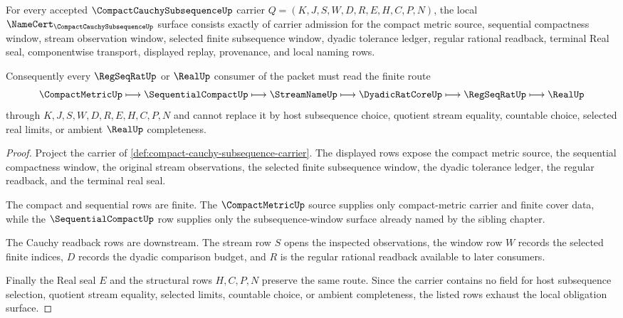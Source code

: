 \begin{theorem}
\label{thm:compact-cauchy-subsequence-obligation-surface}
For every accepted $\CompactCauchySubsequenceUp$ carrier $Q=(K,J,S,W,D,R,E,H,C,P,N)$, the local $\NameCert_{\CompactCauchySubsequenceUp}$ surface consists exactly of carrier admission for the compact metric source, sequential compactness window, stream observation window, selected finite subsequence window, dyadic tolerance ledger, regular rational readback, terminal Real seal, componentwise transport, displayed replay, provenance, and local naming rows.

Consequently every $\RegSeqRatUp$ or $\RealUp$ consumer of the packet must read the finite route
$$
\CompactMetricUp \longmapsto \SequentialCompactUp \longmapsto \StreamNameUp \longmapsto \DyadicRatCoreUp \longmapsto \RegSeqRatUp \longmapsto \RealUp
$$
through $K,J,S,W,D,R,E,H,C,P,N$ and cannot replace it by host subsequence choice, quotient stream equality, countable choice, selected real limits, or ambient $\RealUp$ completeness.
\end{theorem}
\begin{proof}
Project the carrier of \autoref{def:compact-cauchy-subsequence-carrier}. The displayed rows expose the compact metric source, the sequential compactness window, the original stream observations, the selected finite subsequence window, the dyadic tolerance ledger, the regular readback, and the terminal real seal.

The compact and sequential rows are finite. The $\CompactMetricUp$ source supplies only compact-metric carrier and finite cover data, while the $\SequentialCompactUp$ row supplies only the subsequence-window surface already named by the sibling chapter.

The Cauchy readback rows are downstream. The stream row $S$ opens the inspected observations, the window row $W$ records the selected finite indices, $D$ records the dyadic comparison budget, and $R$ is the regular rational readback available to later consumers.

Finally the Real seal $E$ and the structural rows $H,C,P,N$ preserve the same route. Since the carrier contains no field for host subsequence selection, quotient stream equality, selected limits, countable choice, or ambient completeness, the listed rows exhaust the local obligation surface.
\end{proof}

